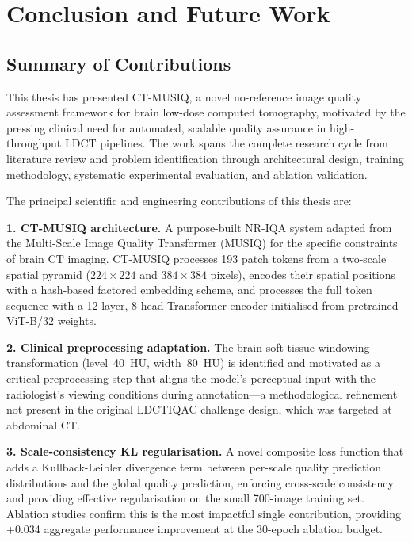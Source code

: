 
\chapter{Conclusion and Future Work}
\label{chap:conclusion}

\section{Summary of Contributions}
\label{sec:conc_summary}

This thesis has presented CT-MUSIQ, a novel no-reference image quality assessment
framework for brain low-dose computed tomography, motivated by the pressing clinical
need for automated, scalable quality assurance in high-throughput LDCT pipelines.
The work spans the complete research cycle from literature review and problem
identification through architectural design, training methodology, systematic experimental
evaluation, and ablation validation.

The principal scientific and engineering contributions of this thesis are:

\textbf{1. CT-MUSIQ architecture.} A purpose-built NR-IQA system adapted from the
Multi-Scale Image Quality Transformer (MUSIQ) for the specific constraints of brain CT
imaging. CT-MUSIQ processes 193 patch tokens from a two-scale spatial pyramid
($224 \times 224$ and $384 \times 384$ pixels), encodes their spatial positions with a
hash-based factored embedding scheme, and processes the full token sequence with a
12-layer, 8-head Transformer encoder initialised from pretrained ViT-B/32 weights.

\textbf{2. Clinical preprocessing adaptation.} The brain soft-tissue windowing
transformation (level~40~HU, width~80~HU) is identified and motivated as a critical
preprocessing step that aligns the model's perceptual input with the radiologist's
viewing conditions during annotation---a methodological refinement not present in the
original LDCTIQAC challenge design, which was targeted at abdominal CT.

\textbf{3. Scale-consistency KL regularisation.} A novel composite loss function that
adds a Kullback-Leibler divergence term between per-scale quality prediction
distributions and the global quality prediction, enforcing cross-scale consistency and
providing effective regularisation on the small 700-image training set. Ablation studies
confirm this is the most impactful single contribution, providing +0.034 aggregate
performance improvement at the 30-epoch ablation budget.

